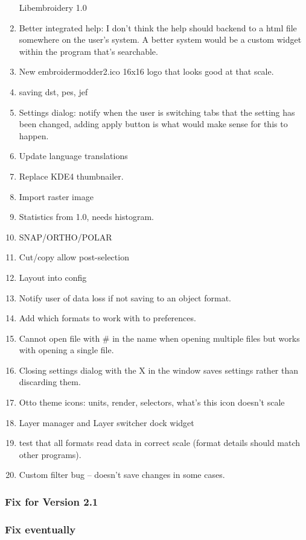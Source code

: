 \documentclass[a4paper, 11pt]{report}
\begin{document}
\begin{enumerate}
  Libembroidery 1.0
\item
  Better integrated help: I don't think the help should backend to a
  html file somewhere on the user's system. A better system would be a
  custom widget within the program that's searchable.
\item
  New embroidermodder2.ico 16x16 logo that looks good at that scale.
\item
  saving dst, pes, jef
\item
  Settings dialog: notify when the user is switching tabs that the
  setting has been changed, adding apply button is what would make sense
  for this to happen.
\item
  Update language translations
\item
  Replace KDE4 thumbnailer.
\item
  Import raster image
\item
  Statistics from 1.0, needs histogram.
\item
  SNAP/ORTHO/POLAR
\item
  Cut/copy allow post-selection
\item
  Layout into config
\item
  Notify user of data loss if not saving to an object format.
\item
  Add which formats to work with to preferences.
\item
  Cannot open file with \# in the name when opening multiple files but
  works with opening a single file.
\item
  Closing settings dialog with the X in the window saves settings rather
  than discarding them.
\item
  Otto theme icons: units, render, selectors, what's this icon doesn't
  scale
\item
  Layer manager and Layer switcher dock widget
\item
  test that all formats read data in correct scale (format details
  should match other programs).
\item
  Custom filter bug -- doesn't save changes in some cases.
\end{enumerate}

\subsubsection{Fix for Version 2.1}
\label{fix-for-version-2.1-1}

\subsubsection{Fix eventually}
\label{fix-eventually-1}
\end{document}
